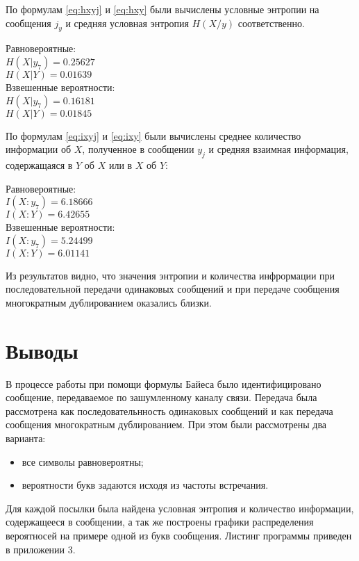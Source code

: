 По формулам \ref{eq:hxyj} и \ref{eq:hxy} были вычислены условные энтропии на сообщения $j_y$ и средняя условная энтропия $H(X/y)$ соответственно. 

\begin{multicols}{2}
\begin{center}
Равновероятные:\\
$H(X|y_7) = 0.25627$\\
$H(X|Y) = 0.01639$\\
Взвешенные вероятности:\\
$H(X|y_7) = 0.16181$\\
$H(X|Y) = 0.01845$
\end{center}
\end{multicols}

По формулам \ref{eq:ixyj} и \ref{eq:ixy} были вычислены среднее количество информации об $X$, полученное в сообщении $y_j$ и средняя взаимная информация, содержащаяся в $Y$ об $X$ или в $X$ об $Y$: 

\begin{multicols}{2}
\begin{center}
Равновероятные:\\
$I(X:y_7) = 6.18666$\\
$I(X:Y) = 6.42655$\\
Взвешенные вероятности:\\
$I(X:y_7) = 5.24499$\\
$I(X:Y) = 6.01141$
\end{center}
\end{multicols}

Из результатов видно, что значения энтропии и количества инфрормации при последовательной передачи одинаковых сообщений и при передаче сообщения многократным дублированием оказались близки.

\section{Выводы}

В процессе работы при помощи формулы Байеса было идентифицировано сообщение, передаваемое по зашумленному каналу связи. Передача была рассмотрена как последовательнность одинаковых сообщений и как передача сообщения многократным дублированием. При этом были рассмотрены два варианта: 
\begin{itemize}
\item все символы равновероятны;
\item вероятности букв задаются исходя из частоты встречания.
\end{itemize}
Для каждой посылки была найдена условная энтропия и количество информации, содержащееся в сообщении, а так же построены графики распределения вероятносей на примере одной из букв сообщения. Листинг программы приведен в приложении 3.

